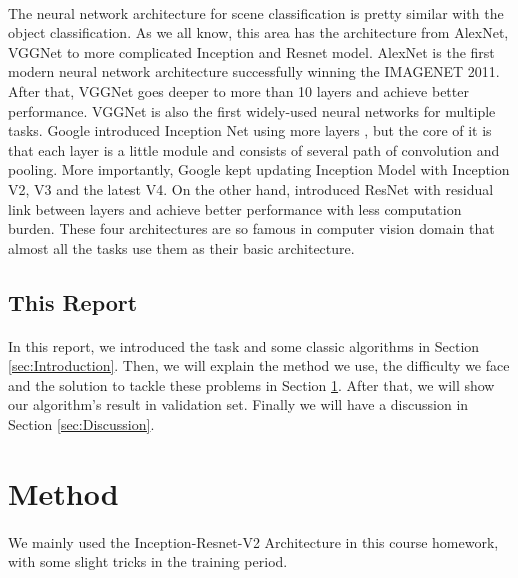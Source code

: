 \documentclass{gapd}
\begin{document}
\paragraph{}
	The neural network architecture for scene classification is pretty similar with the object classification. As we all know, this area has the architecture from AlexNet, VGGNet to more complicated Inception and Resnet model. AlexNet \cite{krizhevsky2012imagenet} is the first modern neural network architecture successfully winning the IMAGENET 2011. After that, VGGNet \cite{simonyan2014very} goes deeper to more than 10 layers and achieve better performance. VGGNet is also the first widely-used neural networks for multiple tasks. Google introduced Inception Net using more layers \cite{szegedy2015going}, but the core of it is that each layer is a little module and consists of several path of convolution and pooling. More importantly, Google kept updating Inception Model with Inception V2, V3 and the latest V4. On the other hand, \citeauthor{he2016deep} introduced ResNet \cite{he2016deep} with residual link between layers and achieve better performance with less computation burden. These four architectures are so famous in computer vision domain that almost all the tasks use them as their basic architecture. 
	
\subsection{This Report}
\paragraph{}
	In this report, we introduced the task and some classic algorithms in Section \ref{sec:Introduction}. Then, we will explain the method we use, the difficulty we face and the solution to tackle these problems in Section \ref{sec:Method}. After that, we will show our algorithm's result in validation set. Finally we will have a discussion in Section \ref{sec:Discussion}. 
	


\section{Method}
\label{sec:Method}
\paragraph{}
	\lettrine{W}{}e mainly used the Inception-Resnet-V2 Architecture in this course homework, with some slight tricks in the training period. 
		
\end{document}
